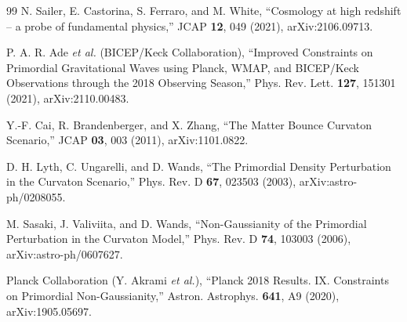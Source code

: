 \documentclass[aps,prd,twocolumn,superscriptaddress,nofootinbib,longbibliography]{revtex4-2}
\begin{document}
\begin{thebibliography}{99}
 N. Sailer, E. Castorina, S. Ferraro, and M. White,
  ``Cosmology at high redshift -- a probe of fundamental physics,''
  JCAP \textbf{12}, 049 (2021), arXiv:2106.09713.

 P. A. R. Ade \textit{et al.} (BICEP/Keck Collaboration),
  ``Improved Constraints on Primordial Gravitational Waves using Planck,
  WMAP, and BICEP/Keck Observations through the 2018 Observing Season,''
  Phys. Rev. Lett. \textbf{127}, 151301 (2021), arXiv:2110.00483.

 Y.-F. Cai, R. Brandenberger, and X. Zhang,
  ``The Matter Bounce Curvaton Scenario,''
  JCAP \textbf{03}, 003 (2011), arXiv:1101.0822.

 D. H. Lyth, C. Ungarelli, and D. Wands,
  ``The Primordial Density Perturbation in the Curvaton Scenario,''
  Phys. Rev. D \textbf{67}, 023503 (2003), arXiv:astro-ph/0208055.

 M. Sasaki, J. Valiviita, and D. Wands,
  ``Non-Gaussianity of the Primordial Perturbation in the Curvaton Model,''
  Phys. Rev. D \textbf{74}, 103003 (2006), arXiv:astro-ph/0607627.

 Planck Collaboration (Y. Akrami \textit{et al.}),
  ``Planck 2018 Results. IX. Constraints on Primordial Non-Gaussianity,''
  Astron. Astrophys. \textbf{641}, A9 (2020), arXiv:1905.05697.

\end{thebibliography}
\end{document}
